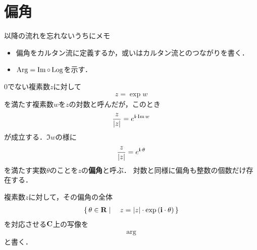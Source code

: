 \section{偏角}
	\begin{itembox}[l]{以降の流れを忘れないうちにメモ}
		\begin{itemize}
			\item 偏角をカルタン流に定義するか，或いはカルタン流とのつながりを書く．
			\item $\operatorname{Arg} = \operatorname{Im} \circ \operatorname{Log}$を示す．
		\end{itemize}
	\end{itembox}
	
	$0$でない複素数$z$に対して
	\begin{align}
		z = \exp{w}
	\end{align}
	を満たす複素数$w$を$z$の対数と呼んだが，このとき
	\begin{align}
		\frac{z}{|z|} = e^{\mathbf{i} \cdot \operatorname{Im} w}
	\end{align}
	が成立する．$\Im{w}$の様に
	\begin{align}
		\frac{z}{|z|} = e^{\mathbf{i} \cdot \theta}
	\end{align}
	を満たす実数$\theta$のことを$z$の{\bf 偏角}と呼ぶ．
	対数と同様に偏角も整数の個数だけ存在する．
	
	\begin{screen}
		\begin{dfn}[偏角]
			複素数$z$に対して，その偏角の全体
			\begin{align}
				\left\{\, \theta \in \mathbf{R} \mid \quad z = |z| \cdot \exp{(\mathbf{i}\cdot \theta)}\, \right\}
			\end{align}
			を対応させる$\mathbf{C}$上の写像を
			\begin{align}
				\arg
			\end{align}
			と書く．
		\end{dfn}
	\end{screen}
	
